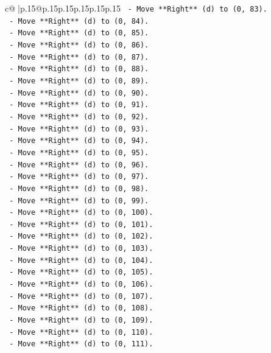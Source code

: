 \documentclass{article}
\begin{document}
{\begin{supertabular}{c@{$\;$}|p{.15\linewidth}@{}p{.15\linewidth}p{.15\linewidth}p{.15\linewidth}p{.15\linewidth}p{.15\linewidth}}
{{{\texttt{    {-} Move **Right** (d) to (0, 83).} \\
\texttt{    {-} Move **Right** (d) to (0, 84).} \\
\texttt{    {-} Move **Right** (d) to (0, 85).} \\
\texttt{    {-} Move **Right** (d) to (0, 86).} \\
\texttt{    {-} Move **Right** (d) to (0, 87).} \\
\texttt{    {-} Move **Right** (d) to (0, 88).} \\
\texttt{    {-} Move **Right** (d) to (0, 89).} \\
\texttt{    {-} Move **Right** (d) to (0, 90).} \\
\texttt{    {-} Move **Right** (d) to (0, 91).} \\
\texttt{    {-} Move **Right** (d) to (0, 92).} \\
\texttt{    {-} Move **Right** (d) to (0, 93).} \\
\texttt{    {-} Move **Right** (d) to (0, 94).} \\
\texttt{    {-} Move **Right** (d) to (0, 95).} \\
\texttt{    {-} Move **Right** (d) to (0, 96).} \\
\texttt{    {-} Move **Right** (d) to (0, 97).} \\
\texttt{    {-} Move **Right** (d) to (0, 98).} \\
\texttt{    {-} Move **Right** (d) to (0, 99).} \\
\texttt{    {-} Move **Right** (d) to (0, 100).} \\
\texttt{    {-} Move **Right** (d) to (0, 101).} \\
\texttt{    {-} Move **Right** (d) to (0, 102).} \\
\texttt{    {-} Move **Right** (d) to (0, 103).} \\
\texttt{    {-} Move **Right** (d) to (0, 104).} \\
\texttt{    {-} Move **Right** (d) to (0, 105).} \\
\texttt{    {-} Move **Right** (d) to (0, 106).} \\
\texttt{    {-} Move **Right** (d) to (0, 107).} \\
\texttt{    {-} Move **Right** (d) to (0, 108).} \\
\texttt{    {-} Move **Right** (d) to (0, 109).} \\
\texttt{    {-} Move **Right** (d) to (0, 110).} \\
\texttt{    {-} Move **Right** (d) to (0, 111).} \\
}}}
\end{supertabular}}
\end{document}
